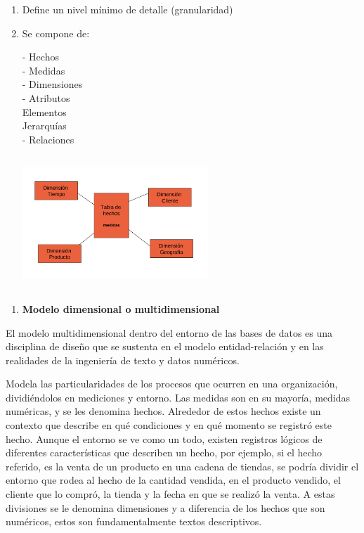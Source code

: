 \begin{enumerate}
\item  Define un nivel mínimo de detalle
(granularidad)

\item  Se compone de:

  - Hechos \\
  - Medidas\\
  - Dimensiones\\
  - Atributos\\
        Elementos\\
        Jerarquías\\
  - Relaciones\\

\begin{center}
\includegraphics[width=7cm, height=5cm]{Imagenes/modelo_dimensional1}
\end{center}
\end{enumerate}

\noindent 

\begin{enumerate}
\item  \textbf{Modelo dimensional o multidimensional}
\end{enumerate}

\noindent \textbf{}
\noindent El modelo multidimensional dentro del entorno de las bases de datos es una disciplina de dise\~{n}o que se sustenta en el modelo entidad-relaci\'{o}n y en las realidades de la ingenier\'{i}a de texto y datos num\'{e}ricos. 

\noindent 

\noindent Modela las particularidades de los procesos que ocurren en una organizaci\'{o}n, dividi\'{e}ndolos en mediciones y entorno. Las medidas son en su mayor\'{i}a, medidas num\'{e}ricas, y se les denomina hechos. Alrededor de estos hechos existe un contexto que describe en qu\'{e} condiciones y en qu\'{e} momento se registr\'{o} este hecho. Aunque el entorno se ve como un todo, existen registros l\'{o}gicos de diferentes caracter\'{i}sticas que describen un hecho, por ejemplo, si el hecho referido, es la venta de un producto en una cadena de tiendas, se podr\'{i}a dividir el entorno que rodea al hecho de la cantidad vendida, en el producto vendido, el cliente que lo compr\'{o}, la tienda y la fecha en que se realiz\'{o} la venta. A estas divisiones se le denomina dimensiones y a diferencia de los hechos que son num\'{e}ricos, estos son fundamentalmente textos descriptivos.

